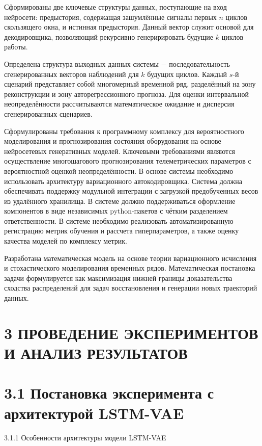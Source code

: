 \documentclass[14pt, a4paper, oneside]{extreport}
\begin{document}
Сформированы две ключевые структуры данных, поступающие на вход нейросети: предыстория, содержащая зашумлённые сигналы первых $n$ циклов скользящего окна, и истинная предыстория. Данный вектор служит основой для декодировщика, позволяющий рекурсивно генеририровать будущие $k$ циклов работы.

Определена структура выходных данных системы $-$ последовательность сгенерированных векторов наблюдений для $k$ будущих циклов. Каждый $s$-й сценарий представляет собой многомерный временной ряд, разделённый на зону реконструкции и зону авторегрессионного прогноза. Для оценки интервальной неопределённости рассчитываются математическое ожидание  и дисперсия сгенерированных сценариев.

Сформулированы требования к программному комплексу для вероятностного моделирования и прогнозирования состояния оборудования на основе нейросетевых генеративных моделей. Ключевыми требованиями являются осуществление многошагового прогнозирования телеметрических параметров с вероятностной оценкой неопределённости. В основе системы необходимо использовать архитектуру вариационного автокодировщика. Система должна обеспечивать поддержку модульной интеграции с загрузкой предобученных весов из удалённого хранилища. В системе должно поддерживаться оформление компонентов в виде независимых python-пакетов с чётким разделением ответственности. В системе необходимо реализовать автоматизированную регистрацию метрик обучения и рассчета гиперпараметров, а также оценку качества моделей по комплексу метрик.

Разработана математическая модель на основе теории вариационного исчисления и стохастического моделирования временных рядов. Математическая постановка задачи формулируется как максимизация нижней границы доказательства сходства распределений для задач восстановления и генерации новых траекторий данных.

\clearpage



\section{3 ПРОВЕДЕНИЕ ЭКСПЕРИМЕНТОВ И АНАЛИЗ РЕЗУЛЬТАТОВ}
\section{3.1 Постановка эксперимента с архитектурой LSTM-VAE}
{3.1.1 Особенности архитектуры модели LSTM-VAE}
\vspace{1em}
\end{document}
